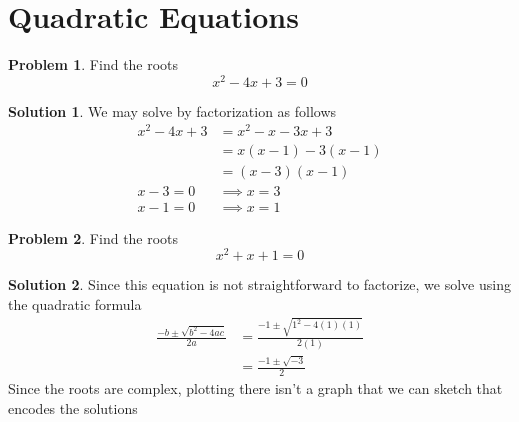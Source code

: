 \documentclass[a4paper]{article}
\theoremstyle{definition}
\newtheorem{problem}{Problem}[section]
\newtheorem*{solution}{Solution}
\begin{document}
\section{Quadratic Equations}

\begin{problem}
Find the roots
\[
x^2 - 4x + 3 = 0
\]
\end{problem}
\begin{solution}
We may solve by factorization as follows
\begin{align*}
x^2 -4x +3  &= x^2 -x -3x +3 \\
    &=x(x-1) - 3(x-1) \\
    &= (x-3)(x-1) \\
x-3 = 0 &\implies x=3 \\
x-1 = 0 &\implies x=1
\end{align*}

\end{solution}


\begin{problem}
Find the roots
\[
x^2 + x + 1 = 0
\]
\end{problem}
\begin{solution}
Since this equation is not straightforward to factorize, we solve using the quadratic formula
\begin{align*}
\frac{-b \pm \sqrt{b^2 - 4ac}}{2a} &= \frac{-1 \pm \sqrt{1^2 - 4(1)(1)}}{2(1)} \\
    &= \frac{-1 \pm \sqrt{-3}}{2}
\end{align*}
Since the roots are complex, plotting there isn't a graph that we can sketch that encodes the solutions
\end{solution}
\end{document}
